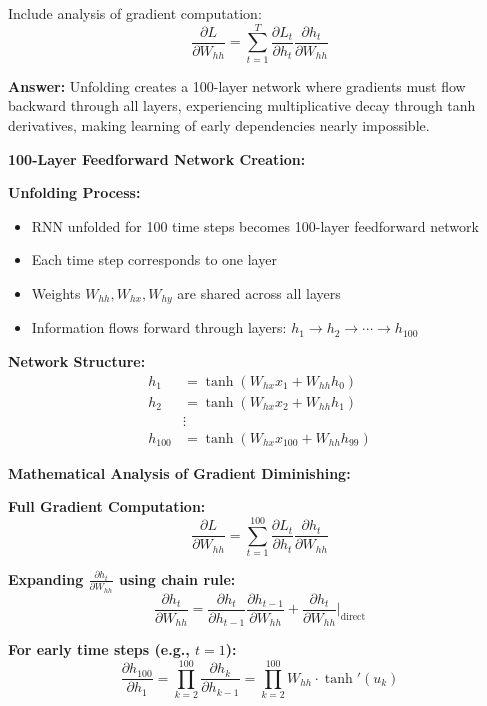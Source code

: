\documentclass[12pt]{article}
\newcommand{\answer}[1]{{\color{answercolor}\textbf{Answer:} #1}}
\newcommand{\explanation}[1]{{\color{explanationcolor}#1}}
\begin{document}
\begin{enumerate}[(a)]
    Include analysis of gradient computation:
    $$\frac{\partial L}{\partial W_{hh}} = \sum_{t=1}^T \frac{\partial L_t}{\partial h_t} \frac{\partial h_t}{\partial W_{hh}}$$
    
    \answer{Unfolding creates a 100-layer network where gradients must flow backward through all layers, experiencing multiplicative decay through tanh derivatives, making learning of early dependencies nearly impossible.}
    
    \explanation{
    \textbf{100-Layer Feedforward Network Creation:}
    
    \textbf{Unfolding Process:}
    \begin{itemize}
        \item RNN unfolded for 100 time steps becomes 100-layer feedforward network
        \item Each time step corresponds to one layer
        \item Weights $W_{hh}, W_{hx}, W_{hy}$ are shared across all layers
        \item Information flows forward through layers: $h_1 \to h_2 \to \cdots \to h_{100}$
    \end{itemize}
    
    \textbf{Network Structure:}
    \begin{align}
    h_1 &= \tanh(W_{hx} x_1 + W_{hh} h_0) \\
    h_2 &= \tanh(W_{hx} x_2 + W_{hh} h_1) \\
    &\vdots \\
    h_{100} &= \tanh(W_{hx} x_{100} + W_{hh} h_{99})
    \end{align}
    
    \textbf{Mathematical Analysis of Gradient Diminishing:}
    
    \textbf{Full Gradient Computation:}
    $$\frac{\partial L}{\partial W_{hh}} = \sum_{t=1}^{100} \frac{\partial L_t}{\partial h_t} \frac{\partial h_t}{\partial W_{hh}}$$
    
    \textbf{Expanding $\frac{\partial h_t}{\partial W_{hh}}$ using chain rule:}
    $$\frac{\partial h_t}{\partial W_{hh}} = \frac{\partial h_t}{\partial h_{t-1}} \frac{\partial h_{t-1}}{\partial W_{hh}} + \frac{\partial h_t}{\partial W_{hh}}\bigg|_{\text{direct}}$$
    
    \textbf{For early time steps (e.g., $t=1$):}
    $$\frac{\partial h_{100}}{\partial h_1} = \prod_{k=2}^{100} \frac{\partial h_k}{\partial h_{k-1}} = \prod_{k=2}^{100} W_{hh} \cdot \tanh'(u_k)$$
    
}
\end{enumerate}
\end{document}
